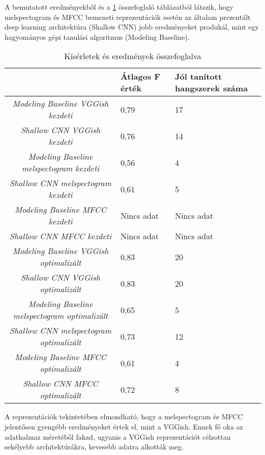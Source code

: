 A bemutatott eredményekből és a \ref{tab:all} összefoglaló táblázatból látszik, hogy melspectogram és MFCC bemeneti reprezentációk esetén az általam prezentált deep learning architektúra (Shallow CNN) jobb eredményeket produkál, mint egy hagyományos gépi tanulási algoritmus (Modeling Baseline).

\begin{table}[H]
	\centering
	\begin{tabular}{ | c | p{} | p{} |}
		\hline
		 & \textbf{Átlagos F érték} & \textbf{Jól tanított hangszerek száma}  \\
		\hline \hline
		\emph{Modeling Baseline VGGish kezdeti} & 0,79 & 17 \\
		\hline
		\emph{Shallow CNN VGGish kezdeti} & 0,76 & 14  \\
		\hline
		\emph{Modeling Baseline melspectogram kezdeti} & 0,56 & 4 \\
		\hline
		\emph{Shallow CNN melspectogram kezdeti} & 0,61 & 5 \\
		\hline
		\emph{Modeling Baseline MFCC kezdeti} & Nincs adat & Nincs adat \\
		\hline
		\emph{Shallow CNN MFCC kezdeti} & Nincs adat & Nincs adat \\
		\hline
		\emph{Modeling Baseline VGGish optimalizált} & 0,83 & 20\\
		\hline
		\emph{Shallow CNN VGGish optimalizált} & 0,83 & 20 \\
		\hline
		\emph{Modeling Baseline melspectogram optimalizált} & 0,65 & 5 \\
		\hline
		\emph{Shallow CNN melspectogram optimalizált} & 0,73 & 12 \\
		\hline
		\emph{Modeling Baseline MFCC optimalizált} & 0,61 & 4 \\
		\hline
		\emph{Shallow CNN MFCC optimalizált} & 0,72 & 8 \\
		\hline
	\end{tabular}
	\caption{Kísérletek és eredmények összefoglalva}
	\label{tab:all}
\end{table}


A reprezentációk tekintetében elmondható, hogy a melspectogram és MFCC jelentősen gyengébb eredményeket értek el, mint a VGGish. Ennek fő oka az adathalmaz méretéből fakad, ugyanis a VGGish reprezentációt célzottan  sekélyebb architektúrákra, kevesebb adatra alkották meg.